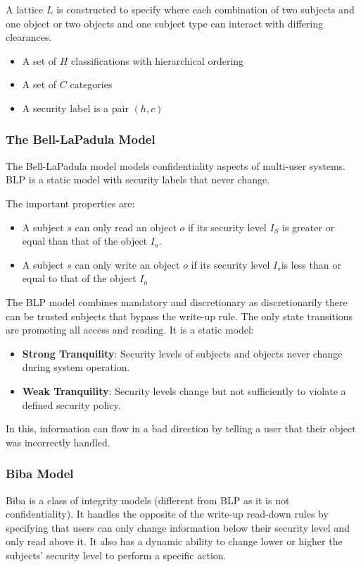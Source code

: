 \documentclass[11pt]{article}
\begin{document}
A lattice $L$ is constructed to specify where each combination of two subjects and one object or two objects and one subject type can interact with differing clearances.

\begin{itemize}
    \item A set of $H$ classifications with hierarchical ordering
    \item A set of $C$ categories
    \item A security label is a pair $(h,c)$
\end{itemize}

\subsubsection{The Bell-LaPadula Model}
The Bell-LaPadula model models confidentiality aspects of multi-user systems.
BLP is a static model with security labels that never change.

The important properties are:
\begin{itemize}
    \item A subject $s$ can only read an object $o$ if its security level $I_S$ is greater or equal than that of the object $I_o$.
    \item A subject $s$ can only write an object $o$ if its security level $I_s$is less than or equal to that of the object $I_o$
\end{itemize}

The BLP model combines mandatory and discretionary as discretionarily there can be trusted subjects that bypass the write-up rule.
The only state transitions are promoting all access and reading.
It is a static model:
\begin{itemize}
    \item \textbf{Strong Tranquility}: Security levels of subjects and objects never change during system operation.
    \item \textbf{Weak Tranquility}: Security levels change but not sufficiently to violate a defined security policy.
\end{itemize}

In this, information can flow in a bad direction by telling a user that their object was incorrectly handled.

\subsubsection{Biba Model}
Biba is a class of integrity models (different from BLP as it is not confidentiality).
It handles the opposite of the write-up read-down rules by specifying that users can only change information below their security level and only read above it.
It also has a dynamic ability to change lower or higher the subjects' security level to perform a specific action.
\end{document}
